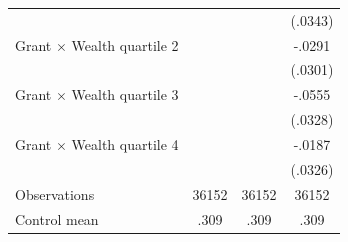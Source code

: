 \begin{tabular*}{\hsize}{@{\hskip\tabcolsep\extracolsep\fill}l*{3}{c}}
                    &            &            &     (.0343)\\
\addlinespace
Grant $\times$ Wealth quartile 2&            &            &      -.0291\\
                    &            &            &     (.0301)\\
\addlinespace
Grant $\times$ Wealth quartile 3&            &            &      -.0555\\
                    &            &            &     (.0328)\\
\addlinespace
Grant $\times$ Wealth quartile 4&            &            &      -.0187\\
                    &            &            &     (.0326)\\
\midrule
Observations        &       36152&       36152&       36152\\
Control mean        &        .309&        .309&        .309\\
\bottomrule
\end{tabular*}
